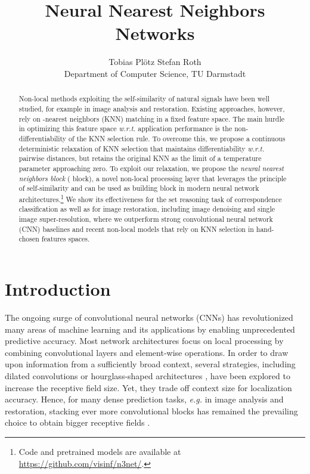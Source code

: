 \documentclass{article}
\title{Neural Nearest Neighbors Networks}
\author{Tobias Pl\"otz \qquad Stefan Roth \\ Department of Computer Science, TU Darmstadt}
\makeatletter
\newcommand{\eg}{\emph{e.\thinspace{}g.}\@\xspace}
\newcommand{\wrt}{\emph{w.\thinspace{}r.\thinspace{}t.}\@\xspace}
\makeatother
\begin{document}
\maketitle



\begin{abstract}
  Non-local methods exploiting the self-similarity of natural signals have been well studied, for example in image analysis and restoration.
Existing approaches, however, rely on -nearest neighbors (KNN) matching in a fixed feature space. 
The main hurdle in optimizing this feature space \wrt application performance is the non-differentiability of the KNN selection rule. 
To overcome this, we propose a continuous deterministic relaxation of KNN selection
that maintains differentiability \wrt pairwise distances, but retains the original KNN as the limit of a temperature parameter approaching zero. 
To exploit our relaxation, we propose the \emph{neural nearest neighbors block} ( block), a novel non-local processing layer that leverages the principle of self-similarity and can be used as building block in modern neural network architectures.\footnote{Code and pretrained models are available at \url{https://github.com/visinf/n3net/}.} 
We show its effectiveness for the set reasoning task of correspondence classification as well as for image restoration, including image denoising and single image super-resolution, where we outperform strong convolutional neural network (CNN) baselines and recent non-local models that rely on KNN selection in hand-chosen features spaces.
 \end{abstract}
\section{Introduction}
The ongoing surge of convolutional neural networks (CNNs) has revolutionized many
areas of machine learning and its applications by enabling unprecedented predictive accuracy. 
Most network architectures focus on local processing by combining convolutional layers and element-wise operations. 
In order to draw upon information from a sufficiently broad context, several strategies, including dilated convolutions \cite{Yu:2015:MSC} or hourglass-shaped architectures \cite{Long:2015:FCN}, have been explored to increase the receptive field size. 
Yet, they trade off context size for localization accuracy.
Hence, for many dense prediction tasks, \eg in image analysis and restoration, stacking ever more convolutional blocks has remained the prevailing choice to obtain bigger receptive fields \cite{Kim:2016:VDSR,Ledig:2017:PRS,Mao:2016:IRU,Timofte:2017:NTI,Zhang:2017:BGD}.
\end{document}

